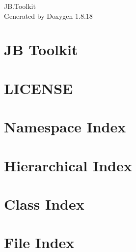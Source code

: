 \let\mypdfximage\pdfximage\def\pdfximage{\immediate\mypdfximage}\documentclass[twoside]{book}
\newcommand{\+}{\discretionary{\mbox{\scriptsize$\hookleftarrow$}}{}{}}
\newcommand{\clearemptydoublepage}{%
  \newpage{\pagestyle{empty}\cleardoublepage}%
}
\begin{document}
\hypersetup{pageanchor=false,
             bookmarksnumbered=true,
             pdfencoding=unicode
            }
\begin{titlepage}
\vspace*{7cm}
\begin{center}%
{\Large J\+B.\+Toolkit }\\
\vspace*{1cm}
{\large Generated by Doxygen 1.8.18}\\
\end{center}
\end{titlepage}
\clearemptydoublepage
{}
\tableofcontents
\clearemptydoublepage
{}
\hypersetup{pageanchor=true}

\chapter{JB Toolkit}
\label{index}\hypertarget{index}{}
\chapter{L\+I\+C\+E\+N\+SE}
\label{md__d_1__one_drive__documents__work__repositories__j_b_8_toolkit__j_b_8_toolkit__xml_doc__conver8223f958c48797a0ecc6a78abb04de14}

\chapter{Namespace Index}

\chapter{Hierarchical Index}

\chapter{Class Index}

\chapter{File Index}

\end{document}
